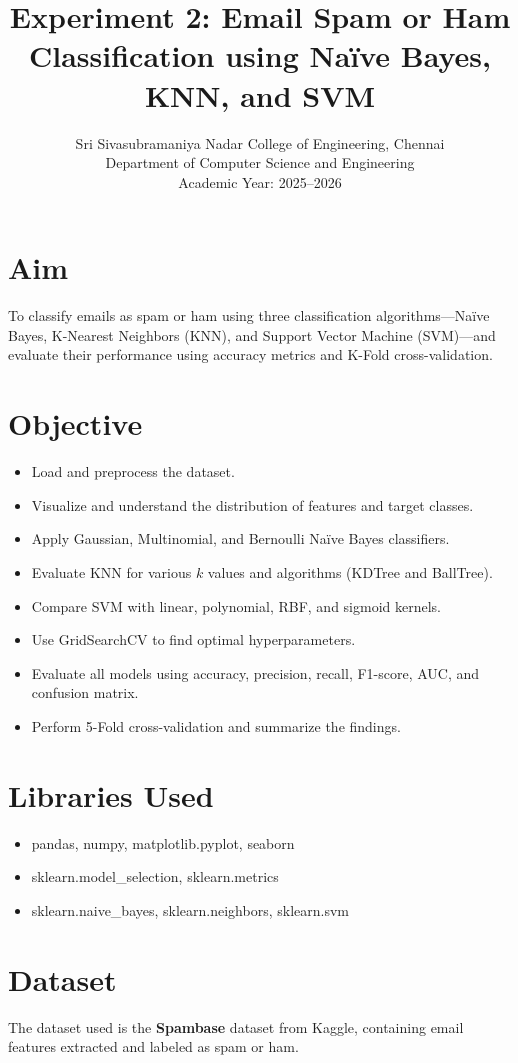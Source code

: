 \documentclass[12pt]{article}
\title{Experiment 2: Email Spam or Ham Classification using Naïve Bayes, KNN, and SVM}
\author{Sri Sivasubramaniya Nadar College of Engineering, Chennai\\Department of Computer Science and Engineering\\Academic Year: 2025--2026}
\date{}
\begin{document}
\maketitle

\section*{Aim}
To classify emails as spam or ham using three classification algorithms—Naïve Bayes, K-Nearest Neighbors (KNN), and Support Vector Machine (SVM)—and evaluate their performance using accuracy metrics and K-Fold cross-validation.

\section*{Objective}
\begin{itemize}
  \item Load and preprocess the dataset.
  \item Visualize and understand the distribution of features and target classes.
  \item Apply Gaussian, Multinomial, and Bernoulli Naïve Bayes classifiers.
  \item Evaluate KNN for various $k$ values and algorithms (KDTree and BallTree).
  \item Compare SVM with linear, polynomial, RBF, and sigmoid kernels.
  \item Use GridSearchCV to find optimal hyperparameters.
  \item Evaluate all models using accuracy, precision, recall, F1-score, AUC, and confusion matrix.
  \item Perform 5-Fold cross-validation and summarize the findings.
\end{itemize}

\section*{Libraries Used}
\begin{itemize}
  \item pandas, numpy, matplotlib.pyplot, seaborn
  \item sklearn.model\_selection, sklearn.metrics
  \item sklearn.naive\_bayes, sklearn.neighbors, sklearn.svm
\end{itemize}

\section*{Dataset}
The dataset used is the \textbf{Spambase} dataset from Kaggle, containing email features extracted and labeled as spam or ham.
\end{document}
